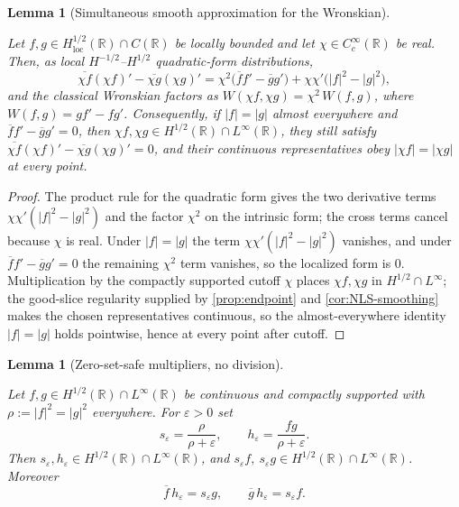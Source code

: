 \documentclass[11pt,oneside]{book}
\providecommand{\uses}[1]{}
\newtheorem{lemma}[theorem]{Lemma}
\theoremstyle{definition}
\theoremstyle{remark}
\newcommand{\R}{\mathbb R}
\newcommand{\1}{\mathbf 1}
\newcommand{\loc}{\mathrm{loc}}
\newcommand{\eps}{\varepsilon}
\begin{document}
\begin{lemma}[Simultaneous smooth approximation for the Wronskian]\label{lem:wronskian-smooth-approx}
\uses{def:Hs-space, def:Hs-loc}
Let $f,g\in H^{1/2}_{\loc}(\R)\cap C(\R)$ be locally bounded and let
$\chi\in C_c^\infty(\R)$ be real. Then, as local
$H^{-1/2}$--$H^{1/2}$ quadratic-form distributions,
\begin{equation}
 \overline{\chi f}(\chi f)'-\overline{\chi g}(\chi g)'
 =\chi^2\bigl(\overline f f'-\overline g g'\bigr)
  +\chi\chi'\bigl(|f|^2-|g|^2\bigr),
\end{equation}
and the classical Wronskian factors as $W(\chi f,\chi g)=\chi^2\,W(f,g)$,
where $W(f,g)=gf'-fg'$. Consequently, if $|f|=|g|$ almost everywhere and
$\overline f f'-\overline g g'=0$, then $\chi f,\chi g\in H^{1/2}(\R)\cap
L^\infty(\R)$, they still satisfy $\overline{\chi f}(\chi f)'
-\overline{\chi g}(\chi g)'=0$, and their continuous representatives obey
$|\chi f|=|\chi g|$ at every point.
\end{lemma}

\begin{proof}
\uses{prop:endpoint, cor:NLS-smoothing}
The product rule for the quadratic form gives the two derivative terms
$\chi\chi'(|f|^2-|g|^2)$ and the factor $\chi^2$ on the intrinsic form; the
cross terms cancel because $\chi$ is real. Under $|f|=|g|$ the term
$\chi\chi'(|f|^2-|g|^2)$ vanishes, and under
$\overline f f'-\overline g g'=0$ the remaining $\chi^2$ term vanishes, so
the localized form is $0$. Multiplication by the compactly supported cutoff
$\chi$ places $\chi f,\chi g$ in $H^{1/2}\cap L^\infty$; the good-slice
regularity supplied by \cref{prop:endpoint} and \cref{cor:NLS-smoothing}
makes the chosen representatives continuous, so the almost-everywhere
identity $|f|=|g|$ holds pointwise, hence at every point after cutoff.
\end{proof}

\begin{lemma}[Zero-set-safe multipliers, no division]\label{lem:wronskian-zero-set-safe}
\uses{def:Hs-space, def:Teps-regularizer}
Let $f,g\in H^{1/2}(\R)\cap L^\infty(\R)$ be continuous and compactly
supported with $\rho:=|f|^2=|g|^2$ everywhere. For $\eps>0$ set
\[
 s_\eps=\frac{\rho}{\rho+\eps},
 \qquad
 h_\eps=\frac{fg}{\rho+\eps}.
\]
Then $s_\eps,h_\eps\in H^{1/2}(\R)\cap L^\infty(\R)$, and
$s_\eps f,\ s_\eps g\in H^{1/2}(\R)\cap L^\infty(\R)$. Moreover
\begin{equation}
 \overline f\,h_\eps=s_\eps g,
 \qquad
 \overline g\,h_\eps=s_\eps f .
\end{equation}
\end{lemma}
\end{document}
